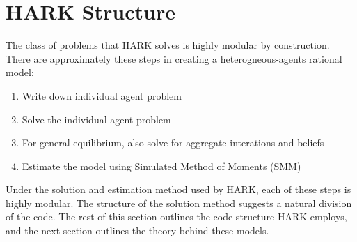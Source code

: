 \documentclass[10pt,twocolumn]{article}
\providecommand{\tightlist}{%
  \setlength{\itemsep}{0pt}\setlength{\parskip}{0pt}}
\begin{document}
\section{\texorpdfstring{HARK Structure
\label{sec:hark-structure}}{HARK Structure }}\label{hark-structure}

\href{Methodological\%20Framework\%20...\%20of\%20the\%20HARK\%20Framework}{}

The class of problems that HARK solves is highly modular by construction. There are approximately these steps in creating a heterogneous-agents rational model:
\begin{enumerate}
\def\labelenumi{\arabic{enumi}.}
\tightlist
\item
  Write down individual agent problem
\item
  Solve the individual agent problem
\item
  For general equilibrium, also solve for aggregate interations and
  beliefs
\item
  Estimate the model using Simulated Method of Moments (SMM)
\end{enumerate}

Under the solution and estimation method used by HARK, each of these
steps is highly modular. The structure of the solution method suggests a
natural division of the code. The rest of this section outlines the code
structure HARK employs, and the next section outlines the theory behind
these models.
\end{document}
